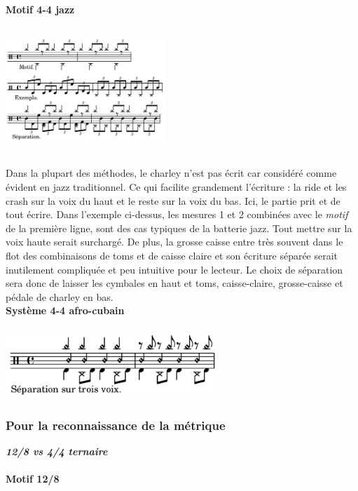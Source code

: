\textbf{Motif 4-4 jazz}\\\\
\includegraphics[height=45mm, width=60mm]{z_images/description_notation/separation/2_separation_4-4_jazz.png}\\\\
Dans la plupart des méthodes, le charley n’est pas écrit car considéré comme évident en jazz traditionnel. Ce qui facilite grandement l’écriture : la ride et les crash sur la voix du haut et le reste sur la voix du bas. Ici, le partie prit et de tout écrire. Dans l’exemple ci-dessus, les mesures 1 et 2 combinées avec le \textit{motif} de la première ligne, sont des cas typiques de la batterie jazz. Tout mettre sur la voix haute serait surchargé. De plus, la grosse caisse entre très souvent dans le flot des combinaisons de toms et de caisse claire et son écriture séparée serait inutilement compliquée et peu intuitive pour le lecteur. Le choix de séparation sera donc de laisser les cymbales en haut et toms, caisse-claire, grosse-caisse et pédale de charley en bas.\\

\textbf{Système 4-4 afro-cubain}\\\\
\includegraphics[height=25mm, width=80mm]{z_images/description_notation/separation/3_separation_afro-cubain.png}\\

\subsubsection{Pour la reconnaissance de la métrique}
\textit{\textbf{12/8 vs 4/4 ternaire}}\\\\
\textbf{Motif 12/8}\\\\

